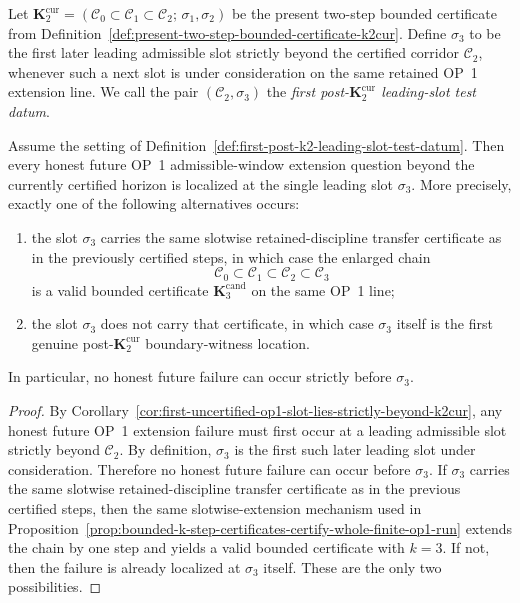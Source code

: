 \begin{definition}
\label{def:first-post-k2-leading-slot-test-datum}
Let $\mathbf K_2^{\mathrm{cur}}=(\mathcal C_0\subset \mathcal C_1\subset \mathcal C_2;\,\sigma_1,\sigma_2)$ be the present two-step bounded certificate from Definition~\ref{def:present-two-step-bounded-certificate-k2cur}. Define $\sigma_3$ to be the first later leading admissible slot strictly beyond the certified corridor $\mathcal C_2$, whenever such a next slot is under consideration on the same retained OP~1 extension line. We call the pair $(\mathcal C_2,\sigma_3)$ the \emph{first post-$\mathbf K_2^{\mathrm{cur}}$ leading-slot test datum}.
\end{definition}

\begin{proposition}
\label{prop:first-honest-future-op1-extension-question-beyond-k2cur-localized-at-sigma3}
Assume the setting of Definition~\ref{def:first-post-k2-leading-slot-test-datum}. Then every honest future OP~1 admissible-window extension question beyond the currently certified horizon is localized at the single leading slot $\sigma_3$. More precisely, exactly one of the following alternatives occurs:
\begin{enumerate}[label=(\roman*),leftmargin=2em]
 \item the slot $\sigma_3$ carries the same slotwise retained-discipline transfer certificate as in the previously certified steps, in which case the enlarged chain
 \[
 \mathcal C_0\subset \mathcal C_1\subset \mathcal C_2\subset \mathcal C_3
 \]
 is a valid bounded certificate $\mathbf K_3^{\mathrm{cand}}$ on the same OP~1 line;
 \item the slot $\sigma_3$ does not carry that certificate, in which case $\sigma_3$ itself is the first genuine post-$\mathbf K_2^{\mathrm{cur}}$ boundary-witness location.
\end{enumerate}
In particular, no honest future failure can occur strictly before $\sigma_3$.
\end{proposition}

\begin{proof}
By Corollary~\ref{cor:first-uncertified-op1-slot-lies-strictly-beyond-k2cur}, any honest future OP~1 extension failure must first occur at a leading admissible slot strictly beyond $\mathcal C_2$. By definition, $\sigma_3$ is the first such later leading slot under consideration. Therefore no honest future failure can occur before $\sigma_3$. If $\sigma_3$ carries the same slotwise retained-discipline transfer certificate as in the previous certified steps, then the same slotwise-extension mechanism used in Proposition~\ref{prop:bounded-k-step-certificates-certify-whole-finite-op1-run} extends the chain by one step and yields a valid bounded certificate with $k=3$. If not, then the failure is already localized at $\sigma_3$ itself. These are the only two possibilities.
\end{proof}

